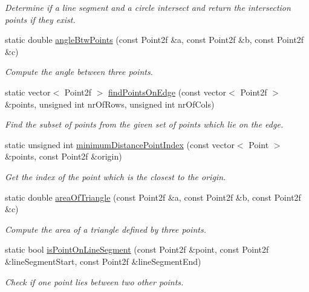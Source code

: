 \begin{DoxyCompactItemize}
\begin{DoxyCompactList}\small\item\em Determine if a line segment and a circle intersect and return the intersection points if they exist. \end{DoxyCompactList}\item 
static double \hyperlink{classmultiscale_1_1Geometry2D_ace72cd1329667fdb5bc3fc40b96694bd}{angle\-Btw\-Points} (const Point2f \&a, const Point2f \&b, const Point2f \&c)
\begin{DoxyCompactList}\small\item\em Compute the angle between three points. \end{DoxyCompactList}\item 
static vector$<$ Point2f $>$ \hyperlink{classmultiscale_1_1Geometry2D_a9e5c6378463c0e685136d66bfac2a8c1}{find\-Points\-On\-Edge} (const vector$<$ Point2f $>$ \&points, unsigned int nr\-Of\-Rows, unsigned int nr\-Of\-Cols)
\begin{DoxyCompactList}\small\item\em Find the subset of points from the given set of points which lie on the edge. \end{DoxyCompactList}\item 
static unsigned int \hyperlink{classmultiscale_1_1Geometry2D_ae8e5e46c312835e27478ce00b11f8a7c}{minimum\-Distance\-Point\-Index} (const vector$<$ Point $>$ \&points, const Point2f \&origin)
\begin{DoxyCompactList}\small\item\em Get the index of the point which is the closest to the origin. \end{DoxyCompactList}\item 
static double \hyperlink{classmultiscale_1_1Geometry2D_abf0e96a63cf744cab74ab94398e28562}{area\-Of\-Triangle} (const Point2f \&a, const Point2f \&b, const Point2f \&c)
\begin{DoxyCompactList}\small\item\em Compute the area of a triangle defined by three points. \end{DoxyCompactList}\item 
static bool \hyperlink{classmultiscale_1_1Geometry2D_a608548e8588d9efbcfec90d2bd92ea55}{is\-Point\-On\-Line\-Segment} (const Point2f \&point, const Point2f \&line\-Segment\-Start, const Point2f \&line\-Segment\-End)
\begin{DoxyCompactList}\small\item\em Check if one point lies between two other points. \end{DoxyCompactList}\item 

\end{DoxyCompactItemize}
